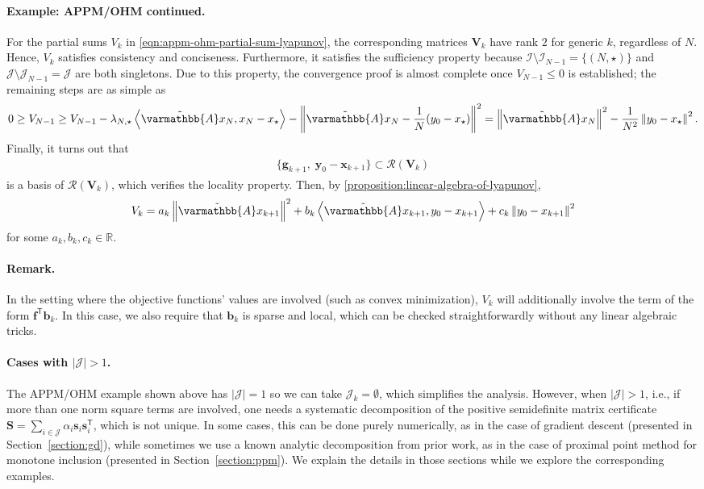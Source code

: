 \documentclass{article}
\theoremstyle{definition}
\theoremstyle{plain}
\newcommand{\vb}{{\mathbf{b}}}
\newcommand{\vf}{{\mathbf{f}}}
\newcommand{\vg}{{\mathbf{g}}}
\newcommand{\vs}{{\mathbf{s}}}
\newcommand{\vx}{{\mathbf{x}}}
\newcommand{\vy}{{\mathbf{y}}}
\newcommand{\vS}{{\mathbf{S}}}
\newcommand{\vV}{{\mathbf{V}}}
\newcommand{\cI}{{\mathcal{I}}}
\newcommand{\cJ}{{\mathcal{J}}}
\newcommand{\cR}{{\mathcal{R}}}
\newcommand{\reals}{\mathbb{R}}
\newcommand{\opA}{{\varmathbb{A}}}
\newcommand{\inprod}[2]{\left\langle #1,#2 \right\rangle}
\newcommand{\sqnorm}[1]{\left\| #1 \right\|^2}
\newcommand{\topa}{\tilde{\opA}}
\newcommand{\transpose}{\mathsf{T}}
\begin{document}
\paragraph{Example: APPM/OHM continued.}
For the partial sums $V_k$ in \eqref{eqn:appm-ohm-partial-sum-lyapunov}, the corresponding matrices $\vV_k$ have rank $2$ for generic $k$, regardless of $N$.
Hence, $V_k$ satisfies consistency and conciseness.
Furthermore, it satisfies the sufficiency property because $\cI\setminus\cI_{N-1} = \{(N,\star)\}$ and $\cJ\setminus\cJ_{N-1}=\cJ$ are both singletons.
Due to this property, the convergence proof is almost complete once $V_{N-1} \le 0$ is established; the remaining steps are as simple as
\begin{align}
\label{eqn:appm-ohm-last-step}
    0 \ge V_{N-1}
    \ge V_{N-1}
    - \lambda_{N,\star} \inprod{\topa x_N}{x_N-x_\star}
    - \sqnorm{\topa x_N-\frac{1}{N}(y_0-x_\star)} =
    \sqnorm{\topa x_N}
    -\frac{1}{N^2}\sqnorm{y_0-x_\star}.
\end{align}
Finally, it turns out that
\begin{align*}
    \{\vg_{k+1},\; \vy_0-\vx_{k+1}\} \subset \cR(\vV_k)
\end{align*}
is a basis of $\cR(\vV_k)$, which verifies the locality property. 
Then, by \cref{proposition:linear-algebra-of-lyapunov}, 
\begin{align}
\label{eqn:appm-ohm-lyapunov-template}
    V_k = a_k\sqnorm{\topa x_{k+1}} + b_k\inprod{\topa x_{k+1}}{y_0-x_{k+1}} + c_k\sqnorm{y_0-x_{k+1}} 
\end{align}
for some $a_k, b_k, c_k \in \reals$.

\paragraph{Remark.} In the setting where the objective functions' values are involved (such as convex minimization), $V_k$ will additionally involve the term of the form $\vf^\transpose \vb_k$.
In this case, we also require that $\vb_k$ is sparse and local, which can be checked straightforwardly without any linear algebraic tricks.

\paragraph{Cases with $|\cJ|>1$.} The APPM/OHM example shown above has $|\cJ|=1$ so we can take $\cJ_k = \emptyset$, which simplifies the analysis.
However, when $|\cJ|>1$, i.e., if more than one norm square terms are involved, one needs a systematic decomposition of the positive semidefinite matrix certificate 
$\vS = \sum_{i\in \cJ} \alpha_i \vs_i\vs_i^\transpose$, which is not unique.
In some cases, this can be done purely numerically, as in the case of gradient descent (presented in Section~\ref{section:gd}), 
while sometimes we use a known analytic decomposition from prior work, as in the case of proximal point method for monotone inclusion (presented in Section~\ref{section:ppm}).
We explain the details in those sections while we explore the corresponding examples.
\end{document}
